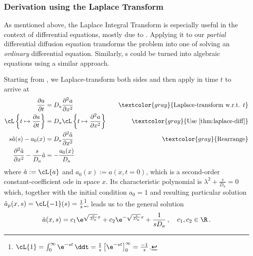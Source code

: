 \documentclass{prettytex/ox/mmsc-special-topic}
\begin{document}
  \subsubsection{Derivation using the Laplace Transform}
  As mentioned above, the Laplace Integral Transform is especially useful in the context of differential equations, mostly due to .
  Applying it to our \textit{partial} differential diffusion equation  transforms the problem into one of solving an \textit{ordinary} differential equation.
  Similarly, s could be turned into algebraic equations using a similar approach.

  Starting from , we Laplace-transform both sides and then apply  in time $t$ to arrive at
  \begin{align*}
    \frac{\partial a}{\partial t}                                   & = D_a \frac{\partial^2 a}{\partial x^2} \quad                             & \textcolor{gray}{\text{Laplace-transform w.r.t. } t} \\
    \cL\left\{t \mapsto \frac{\partial a}{\partial t}\right\}       & = D_a \cL\left\{t \mapsto \frac{\partial^2 a}{\partial x^2}\right\} \quad & \textcolor{gray}{\text{Use \Cref{thm:laplace-diff}}} \\
    s \hat{a}(s) - a_0(x)                                           & = D_a \frac{\partial^2 \hat{a}}{\partial x^2} \quad                       & \textcolor{gray}{\text{Rearrange}}                   \\
    \frac{\partial^2 \hat{a}}{\partial x^2} - \frac{s}{D_a} \hat{a} & = -\frac{a_0(x)}{D_a}
  \end{align*}
  where $\hat{a} := \cL\{a\}$ and $a_0(x) := a(x, t=0)$, which is a second-order constant-coefficient \glsdesc{ode} in space $x$. Its characteristic polynomial is $\lambda^2 + \frac{s}{D_a} = 0$ which, together with the initial condition $a_0 = 1$ and resulting particular solution $\hat{a}_p(x, s) = \cL\{-1\}(s) = \frac{1}{s}$\footnote{$\cL\{1\} = \int_{0}^{\infty} \e^{-st} \,\ddt = \frac{1}{s} \left[\e^{-st}\right]_0^\infty = \frac{-1}{s}$.}, leads us to the general solution
  \begin{equation}
    \hat{a}(x, s) = c_1 \e^{\sqrt{\frac{s}{D_a}}x} + c_2 \e^{-\sqrt{\frac{s}{D_a}}x} + \frac{1}{s D_a}\,,\quad c_1, c_2 \in \R\,.
    \label{eq:laplace-pre-solution}
  \end{equation}
\end{document}
